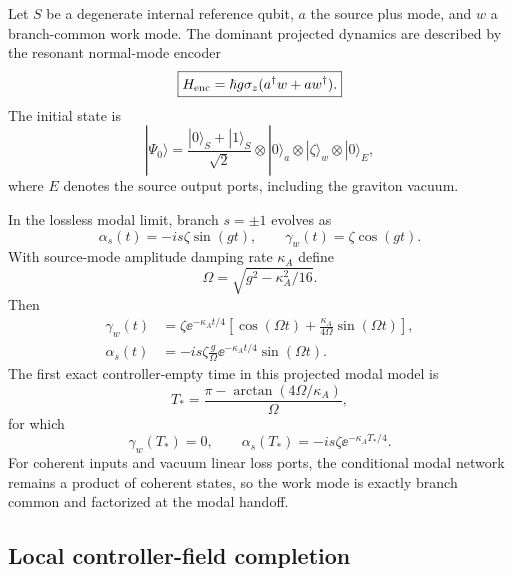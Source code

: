 Let $S$ be a degenerate internal reference qubit, $a$ the source plus mode, and $w$ a branch-common work mode. The dominant projected dynamics are described by the resonant normal-mode encoder
\begin{equation}
\boxed{
H_{\rm enc}=\hbar g\sigma_z(a^\dagger w+a w^\dagger).}
\label{eq:Henc}
\end{equation}
The initial state is
\begin{equation}
|\Psi_0\rangle
=\frac{|0\rangle_S+|1\rangle_S}{\sqrt2}
\otimes|0\rangle_a\otimes|\zeta\rangle_w\otimes|0\rangle_E,
\label{eq:init}
\end{equation}
where $E$ denotes the source output ports, including the graviton vacuum.

In the lossless modal limit, branch $s=\pm1$ evolves as
\begin{equation}
\alpha_s(t)=-is\zeta\sin(gt),
\qquad
\gamma_w(t)=\zeta\cos(gt).
\end{equation}
With source-mode amplitude damping rate $\kappa_A$ define
\begin{equation}
\Omega=\sqrt{g^2-\kappa_A^2/16}.
\end{equation}
Then
\begin{align}
\gamma_w(t)&=\zeta\ee^{-\kappa_A t/4}
\left[\cos(\Omega t)+\frac{\kappa_A}{4\Omega}\sin(\Omega t)\right],\\
\alpha_s(t)&=-is\zeta\frac{g}{\Omega}\ee^{-\kappa_A t/4}\sin(\Omega t).
\end{align}
The first exact controller-empty time in this projected modal model is
\begin{equation}
\boxed{
T_*=\frac{\pi-\arctan(4\Omega/\kappa_A)}{\Omega},}
\label{eq:Tstar}
\end{equation}
for which
\begin{equation}
\gamma_w(T_*)=0,
\qquad
\alpha_s(T_*)=-is\zeta\ee^{-\kappa_A T_*/4}.
\end{equation}
For coherent inputs and vacuum linear loss ports, the conditional modal network remains a product of coherent states, so the work mode is exactly branch common and factorized at the modal handoff.

\subsection{Local controller-field completion}

